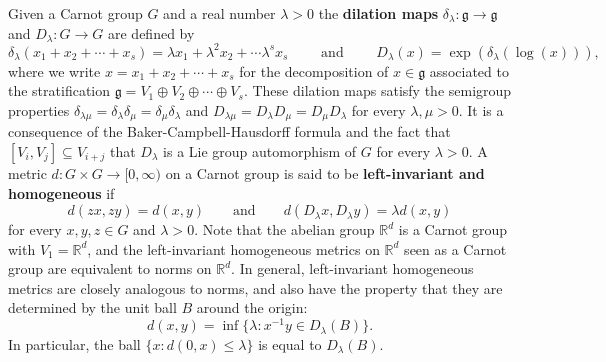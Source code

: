 \documentclass[11pt]{article}
\numberwithin{equation}{section}
\theoremstyle{plain}
\theoremstyle{definition}
\theoremstyle{remark}
\numberwithin{equation}{section}
\newcommand{\R}{\mathbb R}
\numberwithin{equation}{section}
\begin{document}
\medskip

 Given a Carnot group $G$ and a real number $\lambda>0$ the \textbf{dilation maps} $\delta_\lambda:\mathfrak{g}\to\mathfrak{g}$ and $D_\lambda:G\to G$ are defined by
\[
\delta_\lambda(x_1+x_2+\cdots+x_s)= \lambda x_1 + \lambda^2 x_2 + \cdots \lambda^s x_s \qquad \text{ and } \qquad D_\lambda(x) = \exp(\delta_\lambda(\log(x))),
\] 
where we write $x=x_1+x_2+\cdots + x_s$ for the decomposition of $x\in \mathfrak{g}$ associated to the stratification $\mathfrak{g}=V_1\oplus V_2 \oplus \cdots \oplus V_s$. These dilation maps satisfy the semigroup properties $\delta_{\lambda\mu}=\delta_\lambda \delta_\mu=\delta_\mu\delta_\lambda$ and $D_{\lambda \mu}=D_\lambda D_\mu=D_\mu D_{\lambda}$ for every $\lambda,\mu>0$.
It is a consequence of the Baker-Campbell-Hausdorff formula and the fact that $[V_i,V_j] \subseteq V_{i+j}$ that $D_\lambda$ is a Lie group automorphism of $G$ for every $\lambda>0$. A metric $d:G\times G\to [0,\infty)$ on a Carnot group is said to be \textbf{left-invariant and homogeneous} if
\[
d(zx,zy) = d(x,y) \qquad \text{and} \qquad d(D_\lambda x,D_\lambda y) = \lambda d(x,y) 
\]
for every $x,y,z\in G$ and $\lambda>0$. Note that the abelian group $\R^d$ is a Carnot group with $V_1=\R^d$, and the left-invariant homogeneous metrics on $\R^d$ seen as a Carnot group are equivalent to norms on $\R^d$. In general, left-invariant homogeneous metrics are closely analogous to norms, and also have the property that they are determined by the unit ball $B$ around the origin: 
\[
d(x,y)= \inf\{\lambda: x^{-1}y \in D_\lambda(B)\}.
\]
In particular, the ball $\{x:d(0,x)\leq \lambda\}$ is equal to $D_\lambda(B)$. 

\medskip
\end{document}
